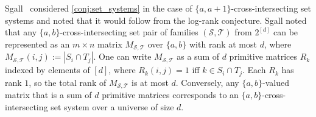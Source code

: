 \documentclass[11pt]{article}
\theoremstyle{plain}
\theoremstyle{remark}
\begin{document}
Sgall~\cite{sgall1999} considered \cref{conj:set_systems} in the case of 
$\{a,a+1\}$-cross-intersecting set systems and noted that it would follow from the log-rank conjecture. %
Sgall noted that any $\{a,b\}$-cross-intersecting set pair of families $(\mathcal{S}, \mathcal{T})$ from $2^{[d]}$ can be represented as an $m \times n$ matrix $M_{\mathcal{S}, \mathcal{T}}$ over $\{a,b\}$ with rank at most $d$, where $M_{\mathcal{S}, \mathcal{T}}(i,j) := |S_i \cap T_j|$. One can write $M_{\mathcal{S}, \mathcal{T}}$ as a sum of $d$ primitive matrices $R_k$ indexed by elements of $[d]$, where $R_k(i,j) = 1$ iff $k \in S_i \cap T_j$. Each $R_k$ has rank $1$, so the total rank of $M_{\mathcal{S}, \mathcal{T}}$ is at most $d$. Conversely, any $\{a,b\}$-valued matrix that is a sum of $d$ primitive matrices corresponds to an $\{a,b\}$-cross-intersecting set system over a universe of size $d$.



\setsystems*
\end{document}
